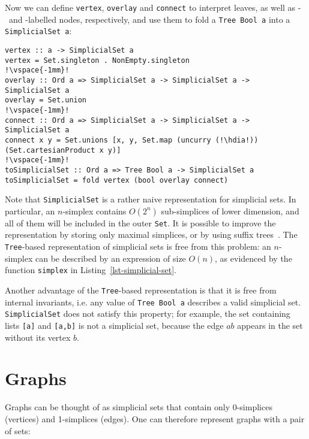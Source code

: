 \documentclass[english,submission]{programming}
\newcommand{\code}[1]{\lstinline[mathescape]|#1|}
\newcommand{\hcode}[1]{{\color{darkblue} \lstinline[keywordstyle={}]|#1|}} %
\newcommand{\hdia}{\,\text{\raisebox{-0.2mm}{\Large\color{darkblue} $\diamond$}}\,}
\newcommand{\zero}{\raisebox{-0.2mm}{\textcircled{0}}\xspace}
\newcommand{\one}{\raisebox{-0.2mm}{\textcircled{1}}\xspace}
\begin{document}
\noindent
Now we can define \hcode{vertex}, \hcode{overlay} and \hcode{connect} to
interpret leaves, as well as \zero-~and \one-labelled nodes, respectively, and
use them to fold a \hcode{Tree Bool a} into a \hcode{SimplicialSet a}:

\begin{lstlisting}
vertex :: a -> SimplicialSet a
vertex = Set.singleton . NonEmpty.singleton
!\vspace{-1mm}!
overlay :: Ord a => SimplicialSet a -> SimplicialSet a -> SimplicialSet a
overlay = Set.union
!\vspace{-1mm}!
connect :: Ord a => SimplicialSet a -> SimplicialSet a -> SimplicialSet a
connect x y = Set.unions [x, y, Set.map (uncurry (!\hdia!)) (Set.cartesianProduct x y)]
!\vspace{-1mm}!
toSimplicialSet :: Ord a => Tree Bool a -> SimplicialSet a
toSimplicialSet = fold vertex (bool overlay connect)
\end{lstlisting}

\noindent
Note that \hcode{SimplicialSet} is a rather naive representation for simplicial
sets. In particular, an $n$-simplex contains $O(2^n)$ sub-simplices of
lower dimension, and all of them will be included in the outer \hcode{Set}. It
is possible to improve the representation by storing only maximal simplices, or
by using suffix trees~\cite{weiner_suffix_trees}. The \hcode{Tree}-based
representation of simplicial sets is free from this problem: an $n$-simplex can
be described by an expression of size $O(n)$, as evidenced by the function
\hcode{simplex} in Listing~\ref{lst-simplicial-set}.

Another advantage of the \hcode{Tree}-based representation is that it is free
from internal invariants, i.e. any value of \hcode{Tree Bool a} describes a
valid simplicial set. \hcode{SimplicialSet} does not satisfy this property; for
example, the set containing lists \code{[a]} and \code{[a,b]} is not a
simplicial set, because the edge $\textit{ab}$ appears in the set without its
vertex $\textit{b}$.

\vspace{-2mm}
\section{Graphs}\label{sec-graph}

Graphs can be thought of as simplicial sets that contain only 0-simplices
(vertices) and 1-simplices (edges). One can therefore represent graphs with a
pair of sets:
\end{document}
